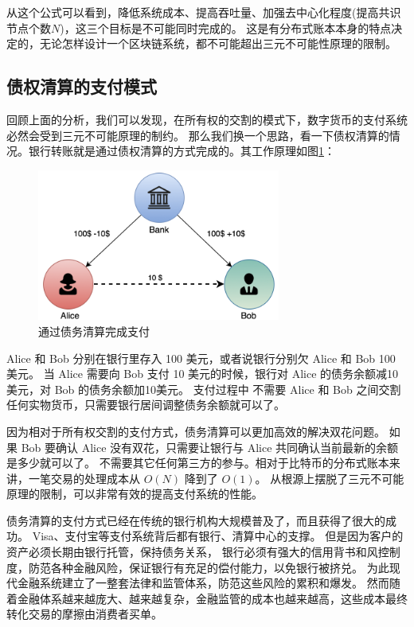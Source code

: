 从这个公式可以看到，降低系统成本、提高吞吐量、加强去中心化程度(提高共识节点个数$N$)，这三个目标是不可能同时完成的。
这是有分布式账本本身的特点决定的，无论怎样设计一个区块链系统，都不可能超出三元不可能性原理的限制。

%

\subsection{债权清算的支付模式}
回顾上面的分析，我们可以发现，在所有权的交割的模式下，数字货币的支付系统必然会受到三元不可能原理的制约。
那么我们换一个思路，看一下债权清算的情况。银行转账就是通过债权清算的方式完成的。其工作原理如图\ref{fig:clearing}：

\begin{figure}[h!]
    \centering
    \includegraphics[width=8cm, keepaspectratio]{../images/clearing.png}
    \caption{通过债务清算完成支付}
    \label{fig:clearing}
\end{figure}

Alice 和 Bob 分别在银行里存入 100 美元，或者说银行分别欠 Alice 和 Bob 100 美元。
当 Alice 需要向 Bob 支付 10 美元的时候，银行对 Alice 的债务余额减10美元，对 Bob 的债务余额加10美元。
支付过程中 不需要 Alice 和 Bob 之间交割任何实物货币，只需要银行居间调整债务余额就可以了。

因为相对于所有权交割的支付方式，债务清算可以更加高效的解决双花问题。
如果 Bob 要确认 Alice 没有双花，只需要让银行与 Alice 共同确认当前最新的余额是多少就可以了。
不需要其它任何第三方的参与。相对于比特币的分布式账本来讲，一笔交易的处理成本从 $O(N)$ 降到了 $O(1)$。
从根源上摆脱了三元不可能原理的限制，可以非常有效的提高支付系统的性能。

债务清算的支付方式已经在传统的银行机构大规模普及了，而且获得了很大的成功。
Visa、支付宝等支付系统背后都有银行、清算中心的支撑。
但是因为客户的资产必须长期由银行托管，保持债务关系，
银行必须有强大的信用背书和风控制度，防范各种金融风险，保证银行有充足的偿付能力，以免银行被挤兑。
为此现代金融系统建立了一整套法律和监管体系，防范这些风险的累积和爆发。
然而随着金融体系越来越庞大、越来越复杂，金融监管的成本也越来越高，这些成本最终转化交易的摩擦由消费者买单。

